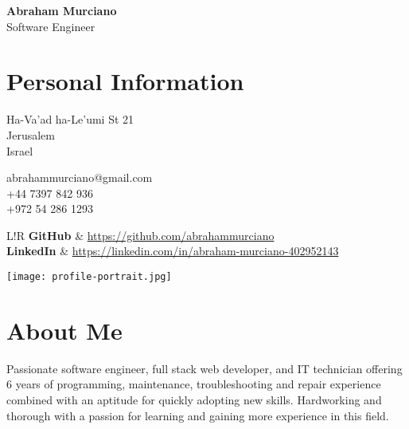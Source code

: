 \documentclass{article}
\newcommand\VRule{\color{lightgray}\vrule width 0.4pt}
\begin{document}
\hspace{-19.4pt}
\begin{minipage}{0.8\textwidth}
	{\bfseries\Huge Abraham Murciano}\vspace{4pt}\\
	{\large Software Engineer}

	\section*{Personal Information}
	\begin{multicols}{2}
		Ha-Va'ad ha-Le'umi St 21\\
		Jerusalem\\
		Israel
		\columnbreak

		abrahammurciano@gmail.com\\
		+44 7397 842 936\\
		+972 54 286 1293
		\columnbreak
	\end{multicols}
	\begin{tabular}{L!{\VRule}R}
		\textbf{GitHub}   & \url{https://github.com/abrahammurciano} \\
		\textbf{LinkedIn} & \url{https://linkedin.com/in/abraham-murciano-402952143}
	\end{tabular}
\end{minipage}
%
\hspace{-20pt}
\begin{minipage}{115pt}
	\begin{flushright}
		\texttt{[image: profile-portrait.jpg]}
	\end{flushright}
\end{minipage}

\section*{About Me}
Passionate software engineer, full stack web developer, and IT technician offering 6 years of programming, maintenance, troubleshooting and repair experience combined with an aptitude for quickly adopting new skills. Hardworking and thorough with a passion for learning and gaining more experience in this field.
\end{document}
